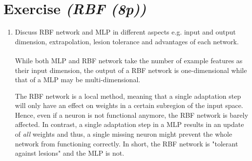 \documentclass{article}
\begin{document}
\section{Exercise \textit{(RBF (8p))}}
\begin{enumerate}
    \item Discuss RBF network and MLP in different aspects e.g. input and output
        dimension, extrapolation, lesion tolerance and advantages of each
        network.\\
        \\
        While both MLP and RBF network take the number of example features as
        their input dimension, the output of a RBF network is one-dimensional
        while that of a MLP may be multi-dimensional.

        The RBF network is a local method, meaning that a single adaptation step
        will only have an effect on weights in a certain subregion of the input
        space. Hence, even if a neuron is not functional anymore, the RBF
        network is barely affected. In contrast, a single adaptation step in a
        MLP results in an update of \textit{all} weights and thus, a single
        missing neuron might prevent the whole network from functioning
        correctly.  In short, the RBF network is "tolerant against lesions" and
        the MLP is not.


\end{enumerate}
\end{document}
